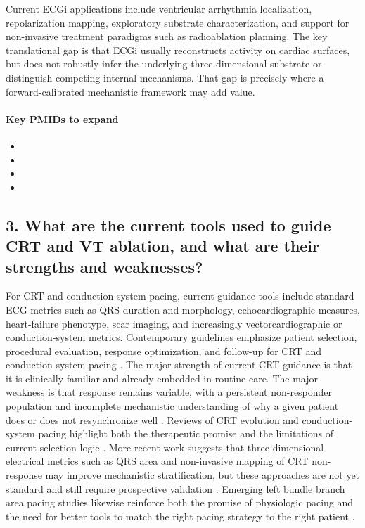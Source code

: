 Current ECGi applications include ventricular arrhythmia localization, repolarization mapping, exploratory substrate characterization, and support for non-invasive treatment paradigms such as radioablation planning. The key translational gap is that ECGi usually reconstructs activity on cardiac surfaces, but does not robustly infer the underlying three-dimensional substrate or distinguish competing internal mechanisms. That gap is precisely where a forward-calibrated mechanistic framework may add value.

\paragraph{Key PMIDs to expand}
\begin{itemize}
    \item {}
    \item {}
    \item {}
    \item {}
\end{itemize}

\subsection*{3. What are the current tools used to guide CRT and VT ablation, and what are their strengths and weaknesses?}

For CRT and conduction-system pacing, current guidance tools include standard ECG metrics such as QRS duration and morphology, echocardiographic measures, heart-failure phenotype, scar imaging, and increasingly vectorcardiographic or conduction-system metrics. Contemporary guidelines emphasize patient selection, procedural evaluation, response optimization, and follow-up for CRT and conduction-system pacing \cite{pmid37283271}. The major strength of current CRT guidance is that it is clinically familiar and already embedded in routine care. The major weakness is that response remains variable, with a persistent non-responder population and incomplete mechanistic understanding of why a given patient does or does not resynchronize well \cite{pmid35715087,pmid37767743,pmid30091132}. Reviews of CRT evolution and conduction-system pacing highlight both the therapeutic promise and the limitations of current selection logic \cite{pmid33247913}. More recent work suggests that three-dimensional electrical metrics such as QRS area and non-invasive mapping of CRT non-response may improve mechanistic stratification, but these approaches are not yet standard and still require prospective validation \cite{pmid35000207,pmid31094217}. Emerging left bundle branch area pacing studies likewise reinforce both the promise of physiologic pacing and the need for better tools to match the right pacing strategy to the right patient \cite{pmid33602393}.

